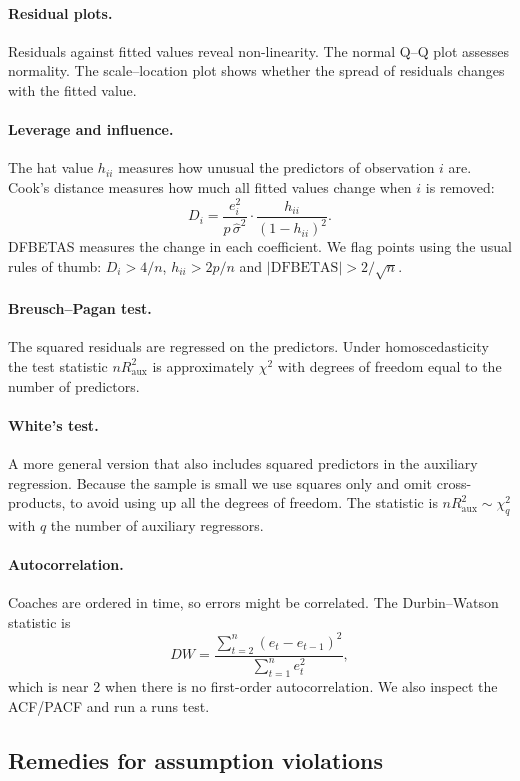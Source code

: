 \documentclass[11pt,a4paper]{article}
\begin{document}
\paragraph{Residual plots.} Residuals against fitted values reveal non-linearity. The normal Q--Q plot assesses normality. The scale--location plot shows whether the spread of residuals changes with the fitted value.

\paragraph{Leverage and influence.} The hat value $h_{ii}$ measures how unusual the predictors of observation $i$ are. Cook's distance measures how much all fitted values change when $i$ is removed:
\[
D_i = \frac{e_i^2}{p\,\hat\sigma^2}\cdot\frac{h_{ii}}{(1-h_{ii})^2}.
\]
DFBETAS measures the change in each coefficient. We flag points using the usual rules of thumb: $D_i > 4/n$, $h_{ii}>2p/n$ and $|\mathrm{DFBETAS}|>2/\sqrt n$.

\paragraph{Breusch--Pagan test.} The squared residuals are regressed on the predictors. Under homoscedasticity the test statistic $nR^2_{\text{aux}}$ is approximately $\chi^2$ with degrees of freedom equal to the number of predictors.

\paragraph{White's test.} A more general version that also includes squared predictors in the auxiliary regression. Because the sample is small we use squares only and omit cross-products, to avoid using up all the degrees of freedom. The statistic is $nR^2_{\text{aux}}\sim\chi^2_{q}$ with $q$ the number of auxiliary regressors.

\paragraph{Autocorrelation.} Coaches are ordered in time, so errors might be correlated. The Durbin--Watson statistic is
\[
DW=\frac{\sum_{t=2}^n (e_t-e_{t-1})^2}{\sum_{t=1}^n e_t^2},
\]
which is near 2 when there is no first-order autocorrelation. We also inspect the ACF/PACF and run a runs test.

\subsection{Remedies for assumption violations}
\end{document}
